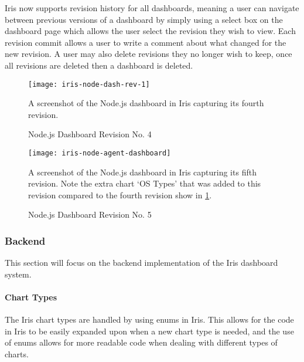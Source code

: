 \documentclass[12pt,a4paper,titlepage]{report}
\begin{document}
Iris now supports revision history for all dashboards, meaning a user can navigate between previous versions of a dashboard by simply using a select box on the dashboard page which allows the user select the revision they wish to view. Each revision commit allows a user to write a comment about what changed for the new revision. A user may also delete revisions they no longer wish to keep, once all revisions are deleted then a dashboard is deleted.
\begin{figure}[H]
\begin{tcolorbox}
\begin{center}
\texttt{[image: iris-node-dash-rev-1]}
\end{center}
A screenshot of the Node.js dashboard in Iris capturing its fourth revision.
\end{tcolorbox}
\caption{Node.js Dashboard Revision No. 4}
\label{fig:dash:rev:4}
\end{figure}
\begin{figure}[H]
\begin{tcolorbox}
\begin{center}
\texttt{[image: iris-node-agent-dashboard]}
\end{center}
A screenshot of the Node.js dashboard in Iris capturing its fifth revision. Note the extra chart `OS Types' that was added to this revision compared to the fourth revision show in \cref{fig:dash:rev:4}.
\end{tcolorbox}
\caption{Node.js Dashboard Revision No. 5}
\end{figure}

\subsubsection{Backend}
This section will focus on the backend implementation of the Iris dashboard system.
\paragraph{Chart Types}
The Iris chart types are handled by using enums in Iris. This allows for the code in Iris to be easily expanded upon when a new chart type is needed, and the use of enums allows for more readable code when dealing with different types of charts.
\end{document}
